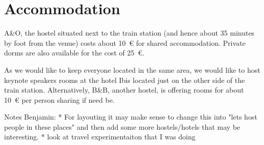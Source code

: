 

\section{Accommodation}

A\&O, the hostel situated next to the train station (and hence about 35 minutes by foot from the venue) costs about \SI{10}{\euro} for shared accommodation. Private dorms are also available for the cost of \SI{25}{\euro}. 

As we would like to keep everyone located in the same area, we would like to host keynote speakers rooms at the hotel Ibis located just on the other side of the train station. 
Alternatively, B\&B, another hostel, is offering rooms for about \SI{10}{\euro} per person sharing if need be. 

Notes Benjamin:
 * For layouting it may make sense to change this into "lets host people in these places"
   and then add some more hostels/hotels that may be interesting.
 * look at travel experimentaiton that I was doing

